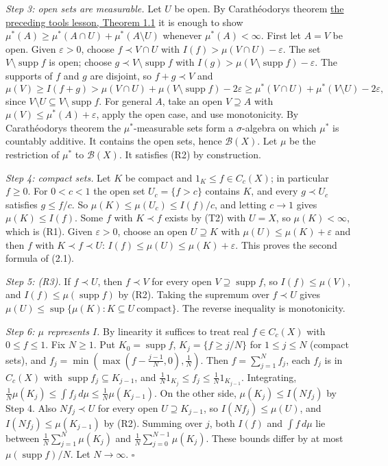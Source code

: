 \documentclass[
  english,
  11pt,
  a4paper,
]{article}
\begin{document}
\emph{Step 3: open sets are measurable.} Let \(U\) be open. By
Carathéodory\textquotesingle s theorem
\hyperref[measure-and-hilbert-space-tools--1-from-an-outer-measure-to-a-measure]{the
preceding tools lesson, Theorem 1.1} it is enough to show
\(\mu^*(A)\geq\mu^*(A\cap U)+\mu^*(A\setminus U)\) whenever
\(\mu^*(A)<\infty\). First let \(A=V\) be open. Given \(\varepsilon>0\),
choose \(f\prec V\cap U\) with \(I(f)>\mu(V\cap U)-\varepsilon\). The
set \(V\setminus\operatorname{supp}f\) is open; choose
\(g\prec V\setminus\operatorname{supp}f\) with
\(I(g)>\mu(V\setminus\operatorname{supp}f)-\varepsilon\). The supports
of \(f\) and \(g\) are disjoint, so \(f+g\prec V\) and
\[\mu(V)\geq I(f+g)>\mu(V\cap U)+\mu(V\setminus\operatorname{supp}f)-2\varepsilon\geq\mu^*(V\cap U)+\mu^*(V\setminus U)-2\varepsilon ,\]
since \(V\setminus U\subseteq V\setminus\operatorname{supp}f\). For
general \(A\), take an open \(V\supseteq A\) with
\(\mu(V)\leq\mu^*(A)+\varepsilon\), apply the open case, and use
monotonicity. By Carathéodory\textquotesingle s theorem the
\(\mu^*\)-measurable sets form a \(\sigma\)-algebra on which \(\mu^*\)
is countably additive. It contains the open sets, hence
\(\mathcal B(X)\). Let \(\mu\) be the restriction of \(\mu^*\) to
\(\mathcal B(X)\). It satisfies (R2) by construction.

\emph{Step 4: compact sets.} Let \(K\) be compact and
\(1_K\leq f\in C_c(X)\); in particular \(f\geq0\). For \(0<c<1\) the
open set \(U_c=\{f>c\}\) contains \(K\), and every \(g\prec U_c\)
satisfies \(g\leq f/c\). So \(\mu(K)\leq\mu(U_c)\leq I(f)/c\), and
letting \(c\to1\) gives \(\mu(K)\leq I(f)\). Some \(f\) with
\(K\prec f\) exists by (T2) with \(U=X\), so \(\mu(K)<\infty\), which is
(R1). Given \(\varepsilon>0\), choose an open \(U\supseteq K\) with
\(\mu(U)\leq\mu(K)+\varepsilon\) and then \(f\) with
\(K\prec f\prec U\): \(I(f)\leq\mu(U)\leq\mu(K)+\varepsilon\). This
proves the second formula of (2.1).

\emph{Step 5: (R3).} If \(f\prec U\), then \(f\prec V\) for every open
\(V\supseteq\operatorname{supp}f\), so \(I(f)\leq\mu(V)\), and
\(I(f)\leq\mu(\operatorname{supp}f)\) by (R2). Taking the supremum over
\(f\prec U\) gives
\(\mu(U)\leq\sup\{\mu(K):K\subseteq U\ \text{compact}\}\). The reverse
inequality is monotonicity.

\emph{Step 6: \(\mu\) represents \(I\).} By linearity it suffices to
treat real \(f\in C_c(X)\) with \(0\leq f\leq1\). Fix \(N\geq1\). Put
\(K_0=\operatorname{supp}f\), \(K_j=\{f\geq j/N\}\) for
\(1\leq j\leq N\) (compact sets), and
\(f_j=\min(\max(f-\frac{j-1}N,0),\frac1N)\). Then \(f=\sum_{j=1}^Nf_j\),
each \(f_j\) is in \(C_c(X)\) with
\(\operatorname{supp}f_j\subseteq K_{j-1}\), and
\(\frac1N1_{K_j}\leq f_j\leq\frac1N1_{K_{j-1}}\). Integrating,
\(\frac1N\mu(K_j)\leq\int f_j\,d\mu\leq\frac1N\mu(K_{j-1})\). On the
other side, \(\mu(K_j)\leq I(Nf_j)\) by Step 4. Also \(Nf_j\prec U\) for
every open \(U\supseteq K_{j-1}\), so \(I(Nf_j)\leq\mu(U)\), and
\(I(Nf_j)\leq\mu(K_{j-1})\) by (R2). Summing over \(j\), both \(I(f)\)
and \(\int f\,d\mu\) lie between \(\frac1N\sum_{j=1}^N\mu(K_j)\) and
\(\frac1N\sum_{j=0}^{N-1}\mu(K_j)\). These bounds differ by at most
\(\mu(\operatorname{supp}f)/N\). Let \(N\to\infty\). \(\square\)
\end{document}
